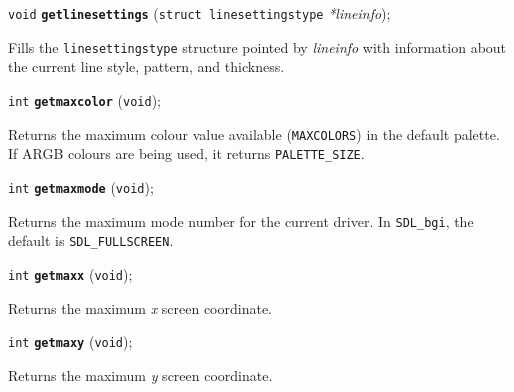 \documentclass[a4paper,12pt]{article}
\newcommand{\SDLbgi}{\texttt{SDL\_bgi}}
\newcommand{\V}{\texttt{void}}      %
\newcommand{\I}{\texttt{int}}       %
\newcommand{\func}[1]{\textbf{\texttt{#1}}}  %
\newcommand{\A}[1]{\emph{#1}}       %
\newcommand{\T}[1]{\texttt{#1}}     %
\newenvironment{bgi}
{ %
  \begin{snugshade}
}
{ %
  \end{snugshade}
}
\begin{document}

\label{sec:getlinesettings}

\begin{bgi}
\V{} \func{getlinesettings} (\texttt{struct linesettingstype}
\A{*lineinfo});
\end{bgi}

Fills the \texttt{linesettingstype} structure pointed by \A{lineinfo}
with information about the current line style, pattern, and thickness.


\label{sec:getmaxcolor}

\begin{bgi}
\I{} \func{getmaxcolor} (\V{});
\end{bgi}

Returns the maximum colour value available (\T{MAXCOLORS}) in the
default palette. If ARGB colours are being used, it returns
\T{PALETTE\_SIZE}.


\label{sec:getmaxmode}

\begin{bgi}
\I{} \func{getmaxmode} (\V{});
\end{bgi}

Returns the maximum mode number for the current driver. In \SDLbgi,
the default is \T{SDL\_FULLSCREEN}.


\label{sec:getmaxx}

\begin{bgi}
\I{} \func{getmaxx} (\V{});
\end{bgi}

Returns the maximum \A{x} screen coordinate.


\label{sec:getmaxy}

\begin{bgi}
\I{} \func{getmaxy} (\V{});
\end{bgi}

Returns the maximum \A{y} screen coordinate.


\label{sec:getmodename}
\end{document}
